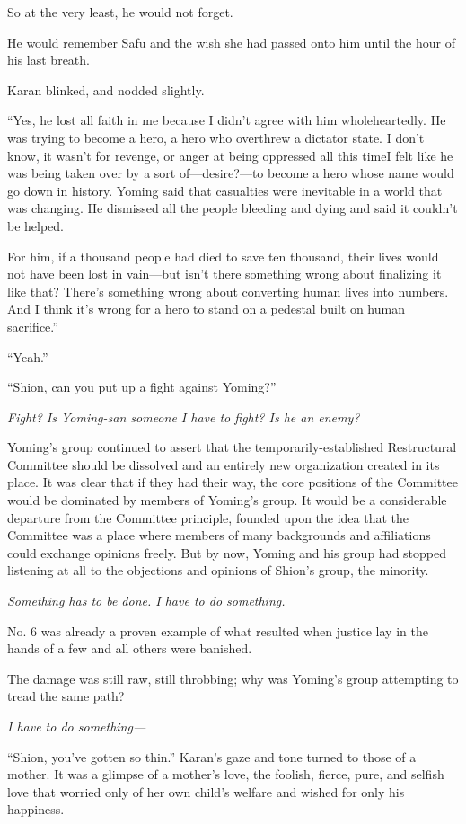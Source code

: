 So at the very least, he would not forget.

He would remember Safu and the wish she had passed onto him until the
hour of his last breath.

Karan blinked, and nodded slightly.

``Yes, he lost all faith in me because I didn't agree with him
wholeheartedly. He was trying to become a hero, a hero who overthrew a
dictator state. I don't know, it wasn't for revenge, or anger at being
oppressed all this time\el I felt like he was being taken over by a sort
of---desire?---to become a hero whose name would go down in history. Yoming
said that casualties were inevitable in a world that was changing. He
dismissed all the people bleeding and dying and said it couldn't be
helped.

For him, if a thousand people had died to save ten thousand, their lives
would not have been lost in vain---but isn't there something wrong about
finalizing it like that? There's something wrong about converting human
lives into numbers. And I think it's wrong for a hero to stand on a
pedestal built on human sacrifice.''

``\el Yeah.''

``Shion, can you put up a fight against Yoming?''

\emph{Fight? Is Yoming-san someone I have to fight? Is he an enemy?}

Yoming's group continued to assert that the temporarily-established
Restructural Committee should be dissolved and an entirely new
organization created in its place. It was clear that if they had their
way, the core positions of the Committee would be dominated by members
of Yoming's group. It would be a considerable departure from the
Committee principle, founded upon the idea that the Committee was a
place where members of many backgrounds and affiliations could exchange
opinions freely. But by now, Yoming and his group had stopped listening
at all to the objections and opinions of Shion's group, the minority.

\emph{Something has to be done. I have to do something.}

No. 6 was already a proven example of what resulted when justice lay in
the hands of a few and all others were banished.

The damage was still raw, still throbbing; why was Yoming's group
attempting to tread the same path?

\emph{I have to do something---}

``Shion, you've gotten so thin.'' Karan's gaze and tone turned to those
of a mother. It was a glimpse of a mother's love, the foolish, fierce,
pure, and selfish love that worried only of her own child's welfare and
wished for only his happiness.

